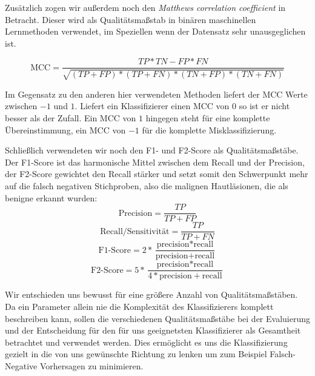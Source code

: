 Zusätzlich zogen wir außerdem noch den \textit{Matthews correlation coefficient} in Betracht. Dieser wird als Qualitätsmaßstab in binären maschinellen Lernmethoden verwendet, im Speziellen wenn der Datensatz sehr unausgeglichen ist. 

\[\text{MCC} = \frac{TP*TN - FP*FN}{\sqrt{(TP+FP)*(TP+FN)*(TN+FP)*(TN+FN)}}\]

Im Gegensatz zu den anderen hier verwendeten Methoden liefert der MCC Werte zwischen $-1$ und $1$. Liefert ein Klassifizierer einen MCC von $0$ so ist er nicht besser als der Zufall. Ein MCC von $1$ hingegen steht für eine komplette Übereinstimmung, ein MCC von $-1$ für die komplette Misklassifizierung.

Schließlich verwendeten wir noch den F1- und F2-Score als Qualitätsmaßstäbe. Der F1-Score ist das harmonische Mittel zwischen dem Recall und der Precision, der F2-Score gewichtet den Recall stärker und setzt somit den Schwerpunkt mehr auf die falsch negativen Stichproben, also die malignen Hautläsionen, die als benigne erkannt wurden:
	\[\text{Precision} = \frac{TP}{TP+FP}\]
    \[\text{Recall/Sensitivität} = \frac{TP}{TP+FN}\]
	\[\text{F1-Score} = 2*\frac{\text{precision}*\text{recall}}	{\text{precision}+\text{recall}}\]
   	\[\text{F2-Score} = 5*\frac{\text{precision}*\text{recall}}	{4*\text{precision}+\text{recall}}\]
    
Wir entschieden uns bewusst für eine größere Anzahl von Qualitätsmaßstäben. Da ein Parameter allein nie die Komplexität des Klassifizierers komplett beschreiben kann, sollen die verschiedenen Qualitätsmaßstäbe bei der Evaluierung und der Entscheidung für den für uns geeignetsten Klassifizierer als Gesamtheit betrachtet und verwendet werden. Dies ermöglicht es uns die Klassifizierung gezielt in die von uns gewünschte Richtung zu lenken um zum Beispiel Falsch-Negative Vorhersagen zu minimieren.
